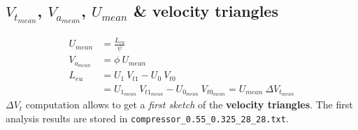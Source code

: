 \subsection{$V_{t_{mean}}$, $V_{a_{mean}}$, $U_{mean}$ \& velocity triangles}
\begin{frame}[fragile]
	\begin{align}
		U_{mean} & = \frac{L_{eu}}{\psi} \\ 
		V_{a_{mean}} & = \phi \ U_{mean} \\ 
		L_{eu} & = U_1 \ V_{t1} - U_0 \ V_{t0} \\ 
		       & = U_{1_{mean}} \ V_{t1_{mean}} - U_{0_{mean}} \ V_{t0_{mean}} = U_{mean} \ \Delta V_{t_{mean}} 
	\end{align}
	$\Delta V_t$ computation allows to get a \textit{first sketch} of the \textbf{velocity triangles}.
	The first analysis results are stored in \verb|compressor_0.55_0.325_28_28.txt|.
\end{frame}

